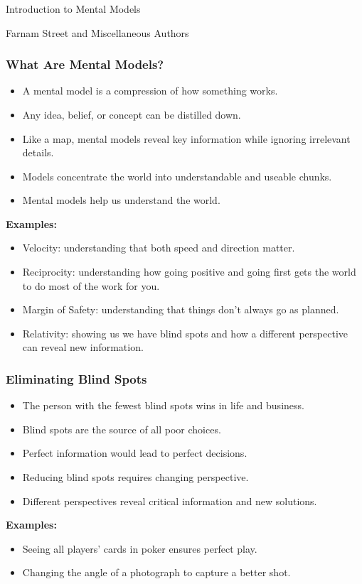\begin{frame}[fragile]\frametitle{}
\begin{center}
{\Large Introduction to Mental Models}

{\tiny Farnam Street and Miscellaneous Authors }


\end{center}
\end{frame}

\begin{frame}[fragile]\frametitle{What Are Mental Models?}
\begin{itemize}
    \item A mental model is a compression of how something works.
    \item Any idea, belief, or concept can be distilled down.
    \item Like a map, mental models reveal key information while ignoring irrelevant details.
    \item Models concentrate the world into understandable and useable chunks.
    \item Mental models help us understand the world.
\end{itemize}
\textbf{Examples:}
\begin{itemize}
    \item Velocity: understanding that both speed and direction matter.
    \item Reciprocity: understanding how going positive and going first gets the world to do most of the work for you.
    \item Margin of Safety: understanding that things don’t always go as planned.
    \item Relativity: showing us we have blind spots and how a different perspective can reveal new information.
\end{itemize}
\end{frame}

\begin{frame}[fragile]\frametitle{Eliminating Blind Spots}
\begin{itemize}
    \item The person with the fewest blind spots wins in life and business.
    \item Blind spots are the source of all poor choices.
    \item Perfect information would lead to perfect decisions.
    \item Reducing blind spots requires changing perspective.
    \item Different perspectives reveal critical information and new solutions.
\end{itemize}
\textbf{Examples:}
\begin{itemize}
    \item Seeing all players' cards in poker ensures perfect play.
    \item Changing the angle of a photograph to capture a better shot.
\end{itemize}
\end{frame}

